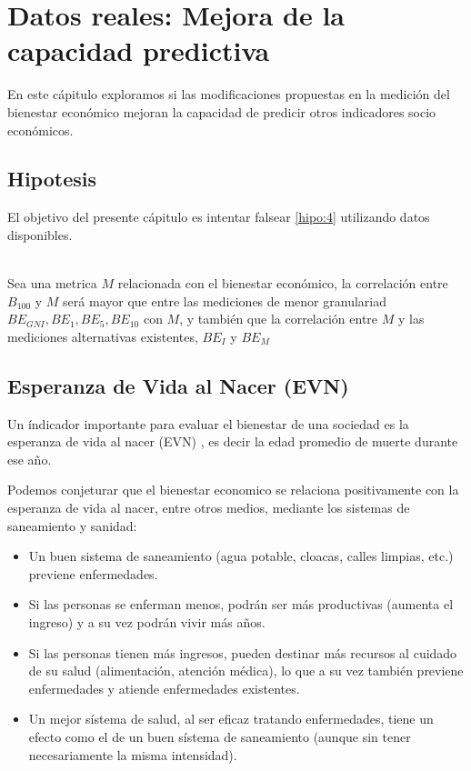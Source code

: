 \chapter{Datos reales: Mejora de la capacidad predictiva} \label{chapter:datos_reales_otros_indicadores}

En este cápitulo exploramos si las modificaciones propuestas en la medición del bienestar económico mejoran la capacidad de predicir otros indicadores socio económicos.

\section{Hipotesis}

El objetivo del presente cápitulo es intentar falsear \ref{hipo:4} utilizando datos disponibles.

\begin{hipotesis}\label{hipo:4}
    \\
    Sea una metrica $M$ relacionada con el bienestar económico, la correlación entre $B_{100}$ y $M$ será mayor que entre las mediciones de menor granulariad $BE_{GNI}, BE_1, BE_5, BE_{10}$ con $M$, y también que la correlación entre $M$ y las mediciones alternativas existentes, $BE_I$ y $BE_M$
\end{hipotesis}


\section{Esperanza de Vida al Nacer (EVN)}

Un índicador importante para evaluar el bienestar de una sociedad es la esperanza de vida al nacer (EVN) \cite{worldbank_health_data}, es decir la edad promedio de muerte durante ese año. 

Podemos conjeturar que el bienestar economico se relaciona positivamente con la esperanza de vida al nacer, entre otros medios, mediante los sistemas de saneamiento y sanidad:

\begin{itemize}
    \item Un buen sistema de saneamiento (agua potable, cloacas, calles limpias, etc.) previene enfermedades.
    \item Si las personas se enferman menos, podrán ser más productivas (aumenta el ingreso) y a su vez podrán vivir más años.
    \item Si las personas tienen más ingresos, pueden destinar más recursos al cuidado de su salud (alimentación, atención médica), lo que a su vez también previene enfermedades y atiende enfermedades existentes.
    \item Un mejor sístema de salud, al ser eficaz tratando enfermedades, tiene un efecto como el de un buen sístema de saneamiento (aunque sin tener necesariamente la misma intensidad).
\end{itemize}

